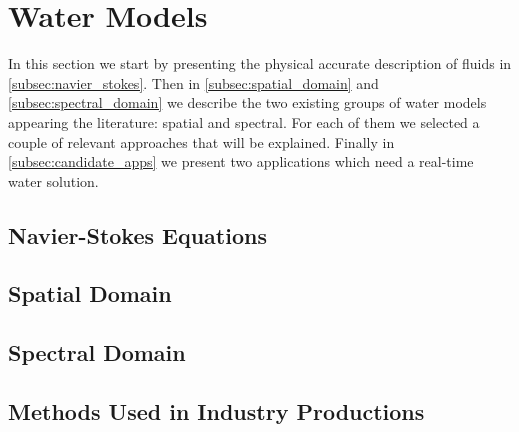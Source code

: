 \section{Water Models}\label{sec:water_models}



In this section we start by presenting the physical accurate description of
fluids in \autoref{subsec:navier_stokes}. Then in
\autoref{subsec:spatial_domain} and \autoref{subsec:spectral_domain} we describe
the two existing groups of water models appearing the literature: spatial and
spectral.  For each of them we selected a couple of relevant approaches that
will be explained. Finally in \autoref{subsec:candidate_apps} we present two
applications which need a real-time water solution.

\subsection{Navier-Stokes Equations}\label{subsec:navier_stokes}



\subsection{Spatial Domain}\label{subsec:spatial_domain}


\subsection{Spectral Domain}\label{subsec:spectral_domain}




\subsection{Methods Used in Industry Productions}\label{subsec:methods_industry}

